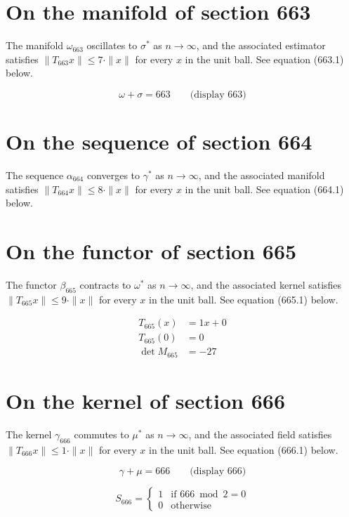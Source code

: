 \documentclass{article}
\begin{document}
\section{On the manifold of section 663}
The manifold $\omega_{663}$ oscillates to $\sigma^{*}$ as $n \to \infty$,
and the associated estimator satisfies $\|T_{663} x\| \leq 7 \cdot \|x\|$
for every $x$ in the unit ball. See equation (663.1) below.

$$
\omega + \sigma = 663 \qquad \text{(display 663)}
$$

\section{On the sequence of section 664}
The sequence $\alpha_{664}$ converges to $\gamma^{*}$ as $n \to \infty$,
and the associated manifold satisfies $\|T_{664} x\| \leq 8 \cdot \|x\|$
for every $x$ in the unit ball. See equation (664.1) below.

\section{On the functor of section 665}
The functor $\beta_{665}$ contracts to $\omega^{*}$ as $n \to \infty$,
and the associated kernel satisfies $\|T_{665} x\| \leq 9 \cdot \|x\|$
for every $x$ in the unit ball. See equation (665.1) below.

\begin{align}
T_{665}(x) &= 1 x + 0 \\
T_{665}(0) &= 0 \\
\det M_{665} &= -27
\end{align}

\section{On the kernel of section 666}
The kernel $\gamma_{666}$ commutes to $\mu^{*}$ as $n \to \infty$,
and the associated field satisfies $\|T_{666} x\| \leq 1 \cdot \|x\|$
for every $x$ in the unit ball. See equation (666.1) below.

$$
\gamma + \mu = 666 \qquad \text{(display 666)}
$$

\begin{equation}
S_{666} = \begin{cases} 1 & \text{if } 666 \bmod 2 = 0 \\ 0 & \text{otherwise} \end{cases}
\end{equation}
\end{document}
